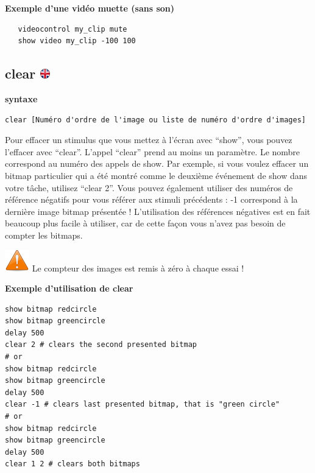 \documentclass[
]{book}
\begin{document}
\textbf{Exemple d'une vidéo muette (sans son)}

\begin{verbatim}
   videocontrol my_clip mute
   show video my_clip -100 100
\end{verbatim}

\hypertarget{clear}{%
\subsection[clear ]{\texorpdfstring{clear \href{https://www.psytoolkit.org/doc3.4.0/syntax.html\#task-clear}{\protect\includegraphics{img/ukflag.png}}}{clear }}\label{clear}}

\textbf{syntaxe}

\begin{verbatim}
clear [Numéro d'ordre de l'image ou liste de numéro d'ordre d'images]
\end{verbatim}

Pour effacer un stimulus que vous mettez à l'écran avec ``show'', vous pouvez l'effacer avec ``clear''. L'appel ``clear'' prend au moins un paramètre. Le nombre correspond au numéro des appels de show. Par exemple, si vous voulez effacer un bitmap particulier qui a été montré comme le deuxième événement de show dans votre tâche, utilisez ``clear 2''. Vous pouvez également utiliser des numéros de référence négatifs pour vous référer aux stimuli précédents : -1 correspond à la dernière image bitmap présentée ! L'utilisation des références négatives est en fait beaucoup plus facile à utiliser, car de cette façon vous n'avez pas besoin de compter les bitmaps.

\includegraphics{img/attention.png} Le compteur des images est remis à zéro à chaque essai !

\textbf{Exemple d'utilisation de clear}

\begin{verbatim}
show bitmap redcircle
show bitmap greencircle
delay 500
clear 2 # clears the second presented bitmap
# or
show bitmap redcircle
show bitmap greencircle
delay 500
clear -1 # clears last presented bitmap, that is "green circle"
# or
show bitmap redcircle
show bitmap greencircle
delay 500
clear 1 2 # clears both bitmaps
\end{verbatim}
\end{document}
